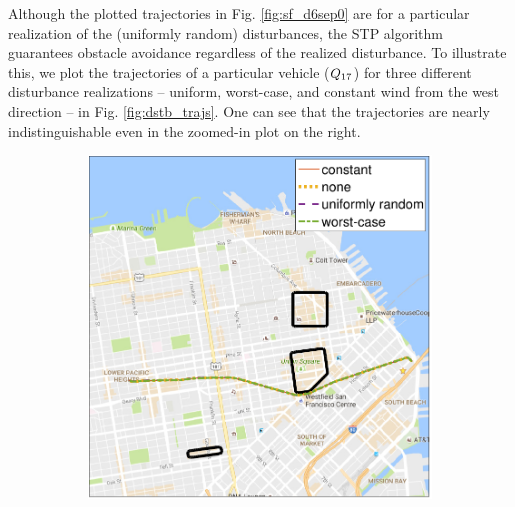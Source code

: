 Although the plotted trajectories in Fig. \ref{fig:sf_d6sep0} are for a particular realization of the (uniformly random) disturbances, the STP algorithm guarantees obstacle avoidance regardless of the realized disturbance. To illustrate this, we plot the trajectories of a particular vehicle ($Q_{17}$) for three different disturbance realizations -- uniform, worst-case, and constant wind from the west direction -- in Fig. \ref{fig:dstb_trajs}. One can see that the trajectories are nearly indistinguishable even in the zoomed-in plot on the right. 

\begin{figure}[!htb]
  \centering
  \begin{subfigure}{0.5\textwidth}
    \includegraphics[width=\columnwidth]{figs/dstb_trajs}
    \subcaption{}
    \label{fig:dstb_trajs_s1}
  \end{subfigure}%
  \begin{subfigure}{0.5\textwidth}

\end{subfigure}
\end{figure}
